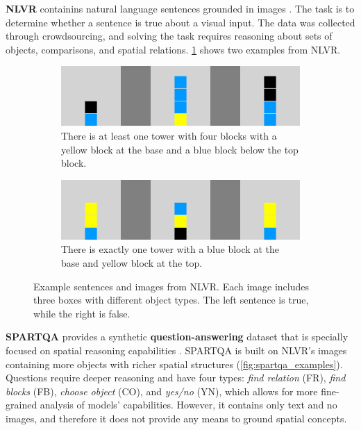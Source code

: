 \textbf{NLVR} containins natural language sentences grounded in images \cite{suhr-etal-2017-corpus}. The task is to determine whether a sentence is true about a visual input. The data was collected through crowdsourcing, and solving the task requires reasoning about sets of objects, comparisons, and spatial relations. \cref{fig:nlvr_examples} shows two examples from NLVR.

\begin{figure}[ht]
  \centering
    \centering
    \begin{subfigure}[b]{0.49\linewidth}
    \centering
    \includegraphics[width=\linewidth]{images/datasets/nlvr_ex_0.png}
    \caption{There is at least one tower with four blocks with a yellow block at the base and a blue block below the top block.}
     \end{subfigure}
     \hfill
     \begin{subfigure}[b]{0.49\linewidth}
     \centering
    \includegraphics[width=\linewidth]{images/datasets/nlvr_ex_1.png}
    \caption{There is exactly one tower with a blue block at the base and yellow block at the top.}
     \end{subfigure}
    \caption{Example sentences and images from NLVR. Each image includes three boxes with different object types. The left sentence is true, while the right is false.}
    \label{fig:nlvr_examples}
\end{figure}

\textbf{SPARTQA} provides a synthetic \textbf{question-answering} dataset that is specially focused on spatial reasoning capabilities \cite{mirzaee-etal-2021-spartqa}. SPARTQA is built on NLVR’s images containing more objects with richer spatial structures (\cref{fig:spartqa_examples}). Questions require deeper reasoning and have four types: {\em find relation} (FR), {\em find blocks} (FB), {\em choose object} (CO), and {\em yes/no} (YN), which allows for more fine-grained analysis of models' capabilities. However, it contains only text and no images, and therefore it does not provide any means to ground spatial concepts.

